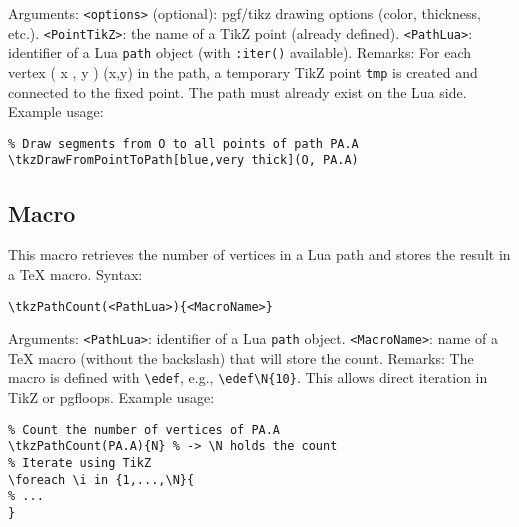 \noindent
Arguments:
\verb|<options>| (optional): pgf/tikz drawing options (color, thickness, etc.).
\verb|<PointTikZ>|: the name of a TikZ point (already defined).
\verb|<PathLua>|: identifier of a Lua \verb|path| object (with \verb|:iter()| available).
\medskip
\noindent
Remarks:
For each vertex
(
x
,
y
)
(x,y) in the path, a temporary TikZ point \verb|tmp| is created and connected to the fixed point.
The path must already exist on the Lua side.
\medskip
\noindent
Example usage:
\begin{mybox}
\begin{verbatim}
% Draw segments from O to all points of path PA.A
\tkzDrawFromPointToPath[blue,very thick](O, PA.A)
\end{verbatim}
\end{mybox}
\subsection{Macro }
This macro retrieves the number of vertices in a Lua path and stores the result in a TeX macro.
\medskip
\noindent
Syntax:
\begin{verbatim}
\tkzPathCount(<PathLua>){<MacroName>}
\end{verbatim}
\noindent
Arguments:
\verb|<PathLua>|: identifier of a Lua \verb|path| object.
\verb|<MacroName>|: name of a TeX macro (without the backslash) that will store the count.
\medskip
\noindent
Remarks:
The macro is defined with \verb|\edef|, e.g., \verb|\edef\N{10}|.
This allows direct iteration in TikZ or pgfloops.
\medskip
\noindent
Example usage:
\begin{mybox}
\begin{verbatim}
% Count the number of vertices of PA.A
\tkzPathCount(PA.A){N} % -> \N holds the count
% Iterate using TikZ
\foreach \i in {1,...,\N}{
% ...
}
\end{verbatim}
\end{mybox}
